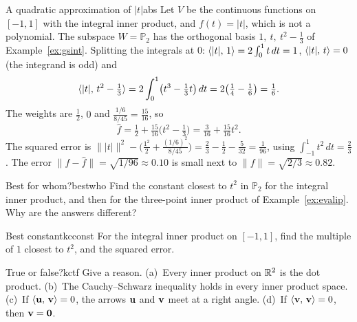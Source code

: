 \documentclass[11pt]{article}
\begin{document}
\begin{exmp}{A quadratic approximation of $|t|$}{abs}
Let $V$ be the continuous functions on $[-1,1]$ with the integral inner product, and $f(t)=|t|$, which is not a polynomial. The subspace $W=\mathbb{P}_2$ has the orthogonal basis $1,\ t,\ t^2-\tfrac13$ of Example~\ref{ex:gsint}. Splitting the integrals at $0$: $\langle |t|,\,1\rangle=2\int_0^1t\,dt=1$, $\langle |t|,\,t\rangle=0$ (the integrand is odd) and
\[
\langle |t|,\,t^2-\tfrac13\rangle=2\int_0^1\bigl(t^3-\tfrac13t\bigr)\,dt=2\bigl(\tfrac14-\tfrac16\bigr)=\tfrac16 .
\]
The weights are $\tfrac12$, $0$ and $\tfrac{1/6}{8/45}=\tfrac{15}{16}$, so
\[
\hat f=\tfrac12+\tfrac{15}{16}\bigl(t^2-\tfrac13\bigr)=\tfrac3{16}+\tfrac{15}{16}t^2 .
\]
The squared error is $\lVert|t|\rVert^2-\bigl(\tfrac{1^2}{2}+\tfrac{(1/6)^2}{8/45}\bigr)=\tfrac23-\tfrac12-\tfrac5{32}=\tfrac1{96}$, using $\int_{-1}^1t^2\,dt=\tfrac23$. The error $\lVert f-\hat f\rVert=\sqrt{1/96}\approx0.10$ is small next to $\lVert f\rVert=\sqrt{2/3}\approx0.82$.
\end{exmp}

\begin{think}{Best for whom?}{bestwho}
Find the constant closest to $t^2$ in $\mathbb{P}_2$ for the integral inner product, and then for the three-point inner product of Example~\ref{ex:evalip}. Why are the answers different?
\end{think}

\begin{kc}{Best constant}{kcconst}
For the integral inner product on $[-1,1]$, find the multiple of $1$ closest to $t^2$, and the squared error.
\end{kc}

\begin{kc}{True or false?}{kctf}
Give a reason. (a)~Every inner product on $\mathbb{R}^2$ is the dot product. (b)~The Cauchy--Schwarz inequality holds in every inner product space. (c)~If $\langle \mathbf{u},\,\mathbf{v}\rangle=0$, the arrows $\mathbf{u}$ and $\mathbf{v}$ meet at a right angle. (d)~If $\langle \mathbf{v},\,\mathbf{v}\rangle=0$, then $\mathbf{v}=\mathbf{0}$.
\end{kc}

\end{document}
